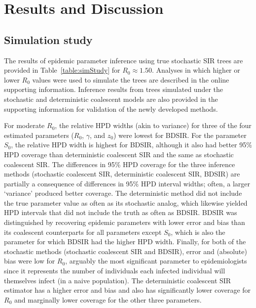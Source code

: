 \documentclass[12pt,titlepage]{article}
\newcommand{\stochCoalSIR}{stochastic coalescent SIR}
\newcommand{\deterCoalSIR}{deterministic coalescent SIR}
\newcommand{\BDSIR}{BDSIR}
\begin{document}
\section*{Results and Discussion}

\subsection{Simulation study}

The results of epidemic parameter inference using true stochastic SIR trees are provided in Table~\ref{table:simStudy} for $R_{0}\approx1.50$.
Analyses in which higher or lower $R_{0}$ 
values were used to simulate the trees are described in the online supporting information.  Inference results from trees simulated under the stochastic and deterministic coalescent models are also provided in the supporting information for validation of the newly developed methods.     

For moderate $R_0$, the relative HPD widths (akin to variance) for three of the four estimated parameters ($R_0$, $\gamma$, and $z_0$) were lowest for \BDSIR{}.  For the 
parameter $S_0$, the relative HPD width is highest for \BDSIR{}, although it also had better 95\% HPD coverage than \deterCoalSIR{} and the same as \stochCoalSIR{}.  
The differences in 95\% HPD coverage for the three inference methods (\stochCoalSIR{}, \deterCoalSIR{}, \BDSIR{}) are partially a consequence of differences in 95\% HPD 
interval widths; often, a larger `variance' produced better coverage.  
The deterministic method did not include the true parameter value as often as its stochastic 
analog, which likewise yielded HPD intervals that did not include the truth as often as \BDSIR{}.  
\BDSIR{} was distinguished by recovering epidemic parameters with lower error and bias than its coalescent counterparts for all parameters except $S_0$, which is also the parameter for which \BDSIR{} had the higher HPD width.
Finally, for both of the stochastic methods (stochastic coalescent SIR and BDSIR), error and (absolute) bias were low for $R_{0}$, arguably the most significant parameter to epidemiologists since it represents the number of individuals each infected individual will themselves infect (in a naive population).  
The deterministic coalescent SIR estimator has a higher error and bias and also has significantly lower coverage for $R_0$ and marginally lower coverage for the other 
three parameters.   
\end{document}
